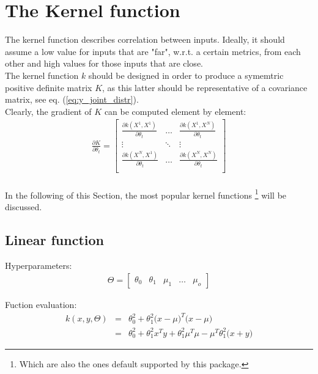 \documentclass{article}
\begin{document}
\section{The Kernel function}
\label{sec:kernel_function}

The kernel function describes correlation between inputs. Ideally, it should assume a low value for inputs that are "far", w.r.t. a certain metrics, from each other and high values for those inputs that are close.
\\
The kernel function $k$ should be designed in order to produce a symemtric positive definite matrix $K$, as this latter should be representative of a covariance matrix, see eq. (\ref{eq:y_joint_distr}).
\\
Clearly, the gradient of $K$ can be computed element by element:
\begin{eqnarray}
\frac{\partial K}{\partial \theta_t} = 
\begin{bmatrix}
\frac{\partial k(X^1, X^1)}{\partial \theta_t} & \hdots & \frac{\partial k(X^1, X^N)}{\partial \theta_t} \\ 
\vdots & \ddots & \vdots \\ 
\frac{\partial k(X^N, X^1)}{\partial \theta_t} & \hdots & \frac{\partial k(X^N, X^N)}{\partial \theta_t} \\ 
\end{bmatrix}
\end{eqnarray}
\\
In the following of this Section, the most popular kernel functions \footnote{Which are also the ones default supported by this package.}  will be discussed.

\subsection{Linear function}

Hyperparameters:
\begin{eqnarray}
\Theta = \begin{bmatrix} \theta_0 & \theta_1 & \mu_1 & \hdots & \mu_o \end{bmatrix}
\end{eqnarray}

Fuction evaluation:
\begin{eqnarray}
k(x,y,\Theta) 
&=& 
\theta_0^2 + \theta_1^2 \big ( x-\mu \big )^T \big ( x-\mu \big ) \\
&=&
\theta_0^2 + \theta_1^2 x^T y + \theta_1^2 \mu^T \mu
- \mu^T \theta_1^2 \big ( x + y \big )
\end{eqnarray}
\end{document}
